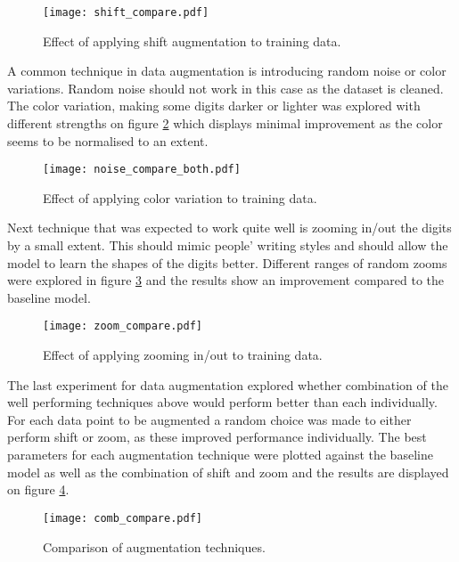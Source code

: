 \documentclass[12pt]{article}
\begin{document}
\begin{figure}[H]
\centering
\texttt{[image: shift\_compare.pdf]}

  \caption{Effect of applying shift augmentation to training data.}
  \label{fig:shift}
\end{figure}

A common technique in data augmentation is introducing random noise or color variations. Random noise should not work in this case as the dataset is cleaned. The color variation, making some digits darker or lighter was explored with different strengths on figure \ref{fig:noise} which displays minimal improvement as the color seems to be normalised to an extent.

\begin{figure}[H]
\centering
\texttt{[image: noise\_compare\_both.pdf]}

  \caption{Effect of applying color variation to training data.}
  \label{fig:noise}
\end{figure}

Next technique that was expected to work quite well is zooming in/out the digits by a small extent. This should mimic people' writing styles and should allow the model to learn the shapes of the digits better. Different ranges of random zooms were explored in figure \ref{fig:zoom} and the results show an improvement compared to the baseline model.


\begin{figure}[H]
\centering
\texttt{[image: zoom\_compare.pdf]}

  \caption{Effect of applying zooming in/out to training data.}
  \label{fig:zoom}
\end{figure}

The last experiment for data augmentation explored whether combination of the well performing techniques above would perform better than each individually. For each data point to be augmented a random choice was made to either perform shift or zoom, as these improved performance individually. The best parameters for each augmentation technique were plotted against the baseline model as well as the combination of shift and zoom and the results are displayed on figure \ref{fig:comb}.

\begin{figure}[H]
\centering
\texttt{[image: comb\_compare.pdf]}

  \caption{Comparison of augmentation techniques.}
  \label{fig:comb}
\end{figure}
\end{document}
